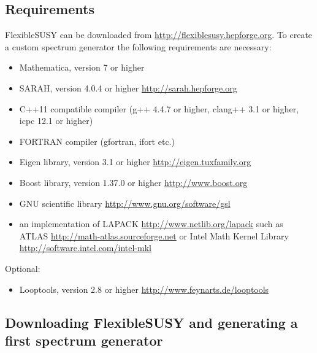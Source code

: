 \documentclass[final,3p,11pt,pdflatex]{elsarticle}
\makeatletter
\newcommand{\fs}{FlexibleSUSY\@\xspace}
\newcommand{\mathematica}{Mathematica\xspace}
\makeatother
\begin{document}
\subsection{Requirements}

\fs can be downloaded from \url{http://flexiblesusy.hepforge.org}.  To
create a custom spectrum generator the following requirements are
necessary:
%
\begin{itemize}
\item \mathematica, version 7 or higher
\item SARAH, version 4.0.4 or higher \url{http://sarah.hepforge.org}
\item C++11 compatible compiler (g++ 4.4.7 or higher, clang++ 3.1 or
  higher, icpc 12.1 or higher)
\item FORTRAN compiler (gfortran, ifort etc.)
\item Eigen library, version 3.1 or higher
  \url{http://eigen.tuxfamily.org}
\item Boost library, version 1.37.0 or higher
  \url{http://www.boost.org}
\item GNU scientific library \url{http://www.gnu.org/software/gsl}
\item an implementation of LAPACK \url{http://www.netlib.org/lapack}
  such as ATLAS \url{http://math-atlas.sourceforge.net} or
  Intel Math Kernel Library \url{http://software.intel.com/intel-mkl}
\end{itemize}
%
Optional:
%
\begin{itemize}
\item Looptools, version 2.8 or higher
  \url{http://www.feynarts.de/looptools}
\end{itemize}

\subsection{Downloading \fs and generating a first spectrum generator}
\label{sec:quick-start-cmssm}
\end{document}
